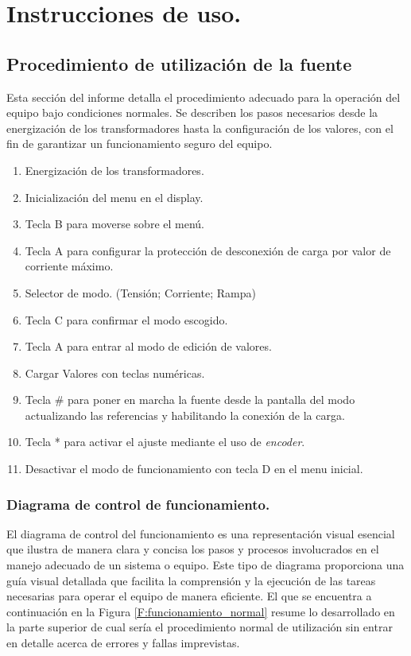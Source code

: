 \chapter{Instrucciones de uso.}

\label{C:Forma de operar la fuente DC}

\section{Procedimiento de utilización de la fuente}

Esta sección del informe detalla el procedimiento adecuado para la operación del equipo bajo condiciones normales. Se describen los pasos necesarios desde la energización de los transformadores hasta la configuración de los valores, con el fin de garantizar un funcionamiento seguro del equipo.\par 

\begin{enumerate}
    \item Energización de los transformadores.
    \item Inicialización del menu en el display.
    \item Tecla B para moverse sobre el menú.
    \item Tecla A para configurar la protección de desconexión de carga por valor de corriente máximo.
    \item Selector de modo. (Tensión; Corriente; Rampa)
    \item Tecla C para confirmar el modo escogido.
    \item Tecla A para entrar al modo de edición de valores.
    \item Cargar Valores con teclas numéricas.
    \item Tecla \# para poner en marcha la fuente desde la pantalla del modo actualizando las referencias y habilitando la conexión de la carga.
    \item Tecla * para activar el ajuste mediante el uso de \textit{encoder}.
    \item Desactivar el modo de funcionamiento con tecla D en el menu inicial.
\end{enumerate}

\subsection{Diagrama de control de funcionamiento.}

El diagrama de control del funcionamiento es una representación visual esencial que ilustra de manera clara y concisa los pasos y procesos involucrados en el manejo adecuado de un sistema o equipo. Este tipo de diagrama proporciona una guía visual detallada que facilita la comprensión y la ejecución de las tareas necesarias para operar el equipo de manera eficiente. El que se encuentra a continuación en la Figura \ref{F:funcionamiento_normal} resume lo desarrollado en la parte superior de cual sería el procedimiento normal de utilización sin entrar en detalle acerca de errores y fallas imprevistas. 

